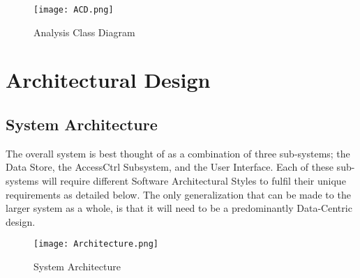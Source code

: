 \documentclass[12pt]{article}
\begin{document}
\begin{figure}[ht]
\texttt{[image: ACD.png]}
\caption{Analysis Class Diagram}
\label{fig:jobInformationDialog}
\end{figure} 
\section{Architectural Design}
\subsection{System Architecture}
The overall system is best thought of as a combination of three sub-systems; the Data Store, the AccessCtrl Subsystem, and the User Interface. Each of these sub-systems will require different Software Architectural Styles to fulfil their unique requirements as detailed below. The only generalization that can be made to the larger system as a whole, is that it will need to be a predominantly Data-Centric design. 
\begin{figure}[here]
\texttt{[image: Architecture.png]}
\caption{System Architecture}
\label{fig:jobInformationDialog}
\end{figure}
\newpage
\end{document}
